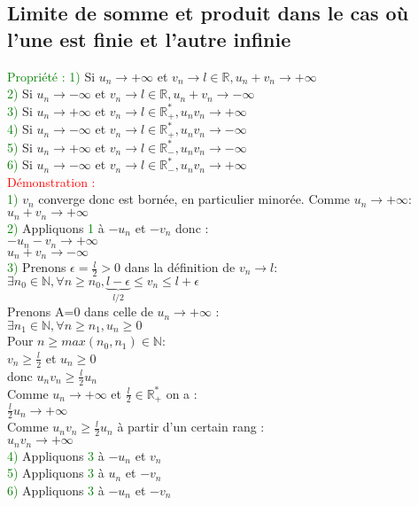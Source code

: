 \documentclass{article}
\begin{document}
\subsection{Limite de somme et produit dans le cas où l'une est finie et l'autre infinie}
\textcolor{green}{Propriété :}
\textcolor{green}{1)} Si $u_n \rightarrow + \infty$ et $v_n \rightarrow l \in \mathbb{R}, u_n +v_n \rightarrow + \infty$ \\ 
\textcolor{green}{2)} Si $u_n \rightarrow - \infty$ et $v_n \rightarrow l \in \mathbb{R}, u_n +v_n \rightarrow - \infty$ \\ 
\textcolor{green}{3)} Si $u_n \rightarrow + \infty$ et $v_n \rightarrow l \in \mathbb{R}_+^*, u_n v_n \rightarrow + \infty$ \\ 
\textcolor{green}{4)} Si $u_n \rightarrow - \infty$ et $v_n \rightarrow l \in \mathbb{R}_+^*, u_n v_n \rightarrow - \infty$ \\ 
\textcolor{green}{5)} Si $u_n \rightarrow + \infty$ et $v_n \rightarrow l \in \mathbb{R}_-^*, u_n v_n \rightarrow - \infty$ \\
\textcolor{green}{6)} Si $u_n \rightarrow - \infty$ et $v_n \rightarrow l \in \mathbb{R}_-^*, u_n v_n \rightarrow + \infty$ \\ 
\textcolor{red}{Démonstration :} \\ 
\textcolor{green}{1)} $v_n$ converge donc est bornée, en particulier minorée. Comme $u_n \rightarrow + \infty$: \\ 
$u_n + v_n \rightarrow + \infty$ \\ 
\textcolor{green}{2)} Appliquons \textcolor{green}{1} à $-u_n$ et $-v_n$ donc : \\ 
$-u_n-v_n \rightarrow + \infty$ \\ 
$u_n+v_n \rightarrow - \infty$ \\ 
\textcolor{green}{3)} Prenons $ \epsilon = \frac{l}{2}>0$ dans la définition de $v_n \rightarrow l$: \\ 
$\exists n_0 \in \mathbb{N}, \forall n \geq n_0, \underbrace{l- \epsilon}_{l/2} \leq v_n \leq l + \epsilon$ \\ 
Prenons A=0 dans celle de $u_n \rightarrow + \infty$ : \\ 
$\exists n_1 \in \mathbb{N}, \forall n \geq n_1,u_n \geq 0$ \\ 
Pour $n \geq max(n_0,n_1)\in \mathbb{N}$: \\ 
$v_n \geq \frac{l}{2}$ et $u_n \geq 0$ \\ 
donc $u_nv_n\geq \frac{l}{2}u_n$ \\ 
Comme $u_n \rightarrow + \infty$ et $\frac{l}{2} \in \mathbb{R}^*_+$ on a : \\
$\frac{l}{2}u_n \rightarrow + \infty$ \\ 
Comme $u_nv_n\geq \frac{l}{2}u_n$ à partir d'un certain rang : \\ 
$u_n v_n \rightarrow + \infty$ \\ 
\textcolor{green}{4)} Appliquons \textcolor{green}{3} à $-u_n$ et $v_n$ \\ 
\textcolor{green}{5)} Appliquons \textcolor{green}{3} à $u_n$ et $-v_n$ \\ 
\textcolor{green}{6)} Appliquons \textcolor{green}{3} à $-u_n$ et $-v_n$ \\ 
\end{document}

